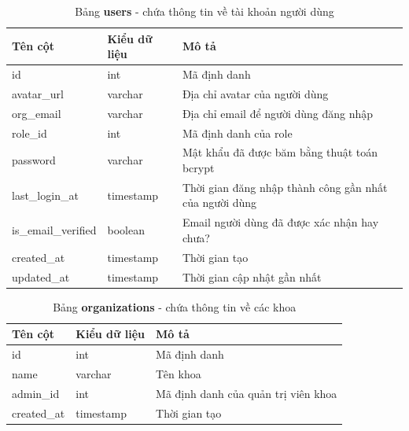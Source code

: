 \documentclass[./../main.tex]{subfiles}
\begin{document}
\begin{table}[H]
	\caption[Bảng users]{Bảng \textbf{users} - chứa thông tin về tài khoản người dùng}
	\label{tab:db_users}
	\begin{tabularx}{\textwidth}{|l|l|X|}
		\hline
		\textbf{Tên cột}    & \textbf{Kiểu dữ liệu} & \textbf{Mô tả}                                         \\ \hline
		id                  & int                   & Mã định danh                                           \\ \hline
		avatar\_url         & varchar               & Địa chỉ avatar của người dùng                          \\ \hline
		org\_email          & varchar               & Địa chỉ email để người dùng đăng nhập                  \\ \hline
		role\_id            & int                   & Mã định danh của role                                  \\ \hline
		password            & varchar               & Mật khẩu đã được băm bằng thuật toán bcrypt            \\ \hline
		last\_login\_at     & timestamp             & Thời gian đăng nhập thành công gần nhất của người dùng \\ \hline
		is\_email\_verified & boolean               & Email người dùng đã được xác nhận hay chưa?            \\ \hline
		created\_at         & timestamp             & Thời gian tạo                                          \\ \hline
		updated\_at         & timestamp             & Thời gian cập nhật gần nhất                            \\ \hline
	\end{tabularx}
\end{table}

\begin{table}[H]
	\caption[Bảng organizations]{Bảng \textbf{organizations} - chứa thông tin về các khoa}
	\label{tab:db_organizations}
	\begin{tabular}{|l|l|l|}
		\hline
		\textbf{Tên cột} & \textbf{Kiểu dữ liệu} & \textbf{Mô tả}                      \\ \hline
		id               & int                   & Mã định danh                        \\ \hline
		name             & varchar               & Tên khoa                            \\ \hline
		admin\_id        & int                   & Mã định danh của quản trị viên khoa \\ \hline
		created\_at      & timestamp             & Thời gian tạo                       \\ \hline
	\end{tabular}
\end{table}
\end{document}
